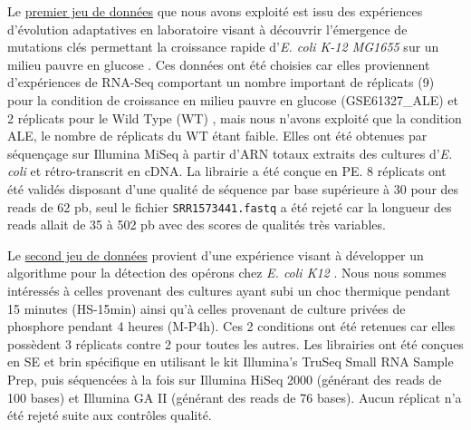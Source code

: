 \documentclass[12pt,a4paper]{report}
\begin{document}
\begin{onehalfspace}
Le \href{http://www.ncbi.nlm.nih.gov/geo/query/acc.cgi?acc=GSE61327}{premier jeu de données} que nous avons exploité est issu des expériences d'évolution adaptatives en laboratoire visant à découvrir l'émergence de mutations clés permettant la croissance rapide d'\textit{E. coli K-12 MG1655} sur un milieu pauvre en glucose \citep{Lacroix2014}. Ces données ont été choisies car elles proviennent d'expériences de RNA-Seq comportant un nombre important de réplicats (9) pour la condition de croissance en milieu pauvre en glucose (GSE61327\_ALE) et 2 réplicats pour le Wild Type (WT) , mais nous n'avons exploité que la condition ALE, le nombre de réplicats du WT étant faible. Elles ont été obtenues par séquençage sur Illumina MiSeq à partir d'ARN totaux extraits des cultures d'\textit{E. coli} et rétro-transcrit en cDNA. La librairie a été conçue en \gls{PE}. 8 réplicats ont été validés disposant d'une qualité de séquence par base supérieure à 30 pour des reads de 62 pb, seul le fichier \texttt{SRR1573441.fastq} a été rejeté car la longueur des reads allait de 35 à 502 pb avec des scores de qualités très variables.

Le \href{http://bioinfolab.uncc.edu/TruHmm_package/raw_data/}{second jeu de données} provient d'une expérience visant à développer un algorithme pour la détection des opérons chez \textit{E. coli K12} \citep{Li2013}. Nous nous sommes intéressés à celles provenant des cultures ayant subi un choc thermique pendant 15 minutes (HS-15min) ainsi qu'à celles provenant de culture privées de phosphore pendant 4 heures (M-P4h). Ces 2 conditions ont été retenues car elles possèdent 3 réplicats contre 2 pour toutes les autres. Les librairies ont été conçues en \gls{SE} et brin spécifique en utilisant le kit Illumina’s TruSeq Small RNA Sample Prep, puis séquencées à la fois sur Illumina HiSeq 2000 (générant des reads de 100 bases) et Illumina GA II (générant des reads de 76 bases). Aucun réplicat n'a été rejeté suite aux contrôles qualité.


\end{onehalfspace}
\end{document}
